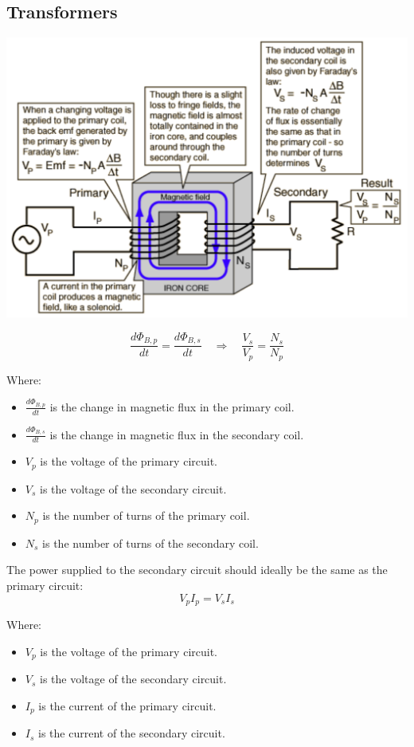\documentclass[11pt]{article}
\begin{document}
\subsection{Transformers}
\label{sec:org9b3d5e2}
\begin{center}
\includegraphics[width=.9\linewidth]{./images/transformers.png}
\end{center}

\[\frac{d \Phi_{B, p}}{dt} = \frac{d \Phi_{B, s}}{dt} \quad \Longrightarrow \quad \frac{V_s}{V_p} = \frac{N_s}{N_p}\]

Where:
\begin{itemize}
\item \(\frac{d \Phi_{B, p}}{dt}\) is the change in magnetic flux in the primary coil.
\item \(\frac{d \Phi_{B, s}}{dt}\) is the change in magnetic flux in the secondary coil.
\item \(V_p\) is the voltage of the primary circuit.
\item \(V_s\) is the voltage of the secondary circuit.
\item \(N_p\) is the number of turns of the primary coil.
\item \(N_s\) is the number of turns of the secondary coil.
\end{itemize}

\newpage

The power supplied to the secondary circuit should ideally be the same as the primary circuit:
\[V_p I_p = V_s I_s\]

Where:
\begin{itemize}
\item \(V_p\) is the voltage of the primary circuit.
\item \(V_s\) is the voltage of the secondary circuit.
\item \(I_p\) is the current of the primary circuit.
\item \(I_s\) is the current of the secondary circuit.
\end{itemize}
\end{document}
